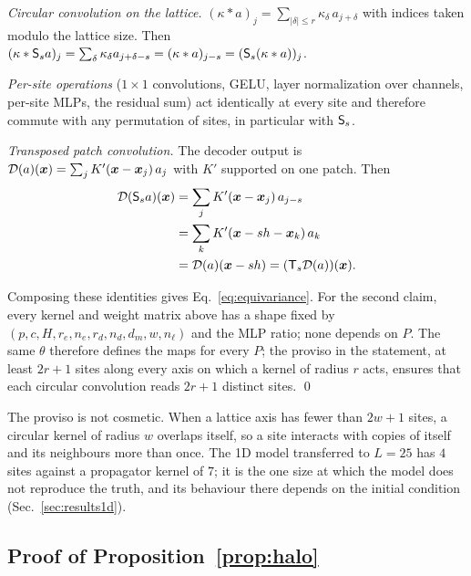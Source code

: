 \emph{Circular convolution on the lattice.} $(\kappa * a)_j =
\sum_{|\delta|\le r}\kappa_\delta\,a_{j+\delta}$ with indices taken
modulo the lattice size. Then $(\kappa*\mathsf{S}_s a)_j = \sum_\delta
\kappa_\delta a_{j+\delta-s} = (\kappa*a)_{j-s} = (\mathsf{S}_s(\kappa*a))_j$.

\emph{Per-site operations} ($1\times1$ convolutions, GELU, layer
normalization over channels, per-site MLPs, the residual sum) act
identically at every site and therefore commute with any permutation of
sites, in particular with $\mathsf{S}_s$.

\emph{Transposed patch convolution.} The decoder output is
$\mathcal{D}(a)(\bm{x}) = \sum_{j}K'(\bm{x}-\bm{x}_j)\,a_j$ with $K'$ supported
on one patch. Then
\[
\begin{aligned}
  \mathcal{D}(\mathsf{S}_s a)(\bm{x}) &= \sum_j K'(\bm{x}-\bm{x}_j)\,a_{j-s}\\
  &= \sum_k K'(\bm{x}-sh-\bm{x}_k)\,a_k\\
  &= \mathcal{D}(a)(\bm{x}-sh) = (\mathsf{T}_{s}\mathcal{D}(a))(\bm{x}).
\end{aligned}
\]

Composing these identities gives Eq.~\eqref{eq:equivariance}. For the
second claim, every kernel and weight matrix above has a shape fixed by
$(p, c, H, r_e, n_e, r_d, n_d, d_m, w, n_\ell)$ and the MLP ratio; none
depends on $P$. The same $\theta$ therefore defines the maps for every
$P$; the proviso in the statement, at least $2r+1$ sites along every
axis on which a kernel of radius $r$ acts, ensures that each circular
convolution reads $2r+1$ distinct sites. \qed

\begin{remark}
The proviso is not cosmetic. When a lattice axis has fewer than $2w+1$
sites, a circular kernel of radius $w$ overlaps itself, so a site
interacts with copies of itself and its neighbours more than once. The
1D model transferred to $L=25$ has $4$ sites against a propagator kernel
of $7$; it is the one size at which the model does not reproduce the
truth, and its behaviour there depends on the initial condition
(Sec.~\ref{sec:results1d}).
\end{remark}

\subsection{Proof of Proposition~\ref{prop:halo}}

